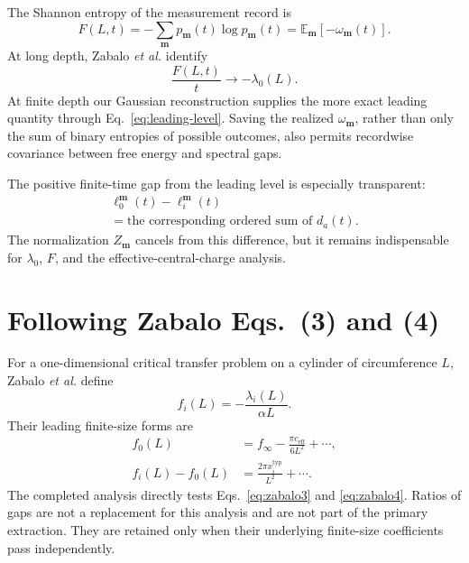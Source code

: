 \documentclass[aps,prb,twocolumn,floatfix,nofootinbib,superscriptaddress]{revtex4-2}
\newcommand{\E}{\mathbb{E}}
\begin{document}
The Shannon entropy of the measurement record is
\begin{equation}
 F(L,t)
 =-\sum_{\boldsymbol m}p_{\boldsymbol m}(t)\log p_{\boldsymbol m}(t)
 =\E_{\boldsymbol m}[-\omega_{\boldsymbol m}(t)].
 \label{eq:free-energy}
\end{equation}
At long depth, Zabalo \emph{et al.} identify
\begin{equation}
 \frac{F(L,t)}{t}\longrightarrow-\lambda_0(L).
 \label{eq:f-lambda0}
\end{equation}
At finite depth our Gaussian reconstruction supplies the more exact leading quantity through Eq.~\eqref{eq:leading-level}.  Saving the realized \(\omega_{\boldsymbol m}\), rather than only the sum of binary entropies of possible outcomes, also permits recordwise covariance between free energy and spectral gaps.

The positive finite-time gap from the leading level is especially transparent:
\begin{multline}
 \ell_0^{\boldsymbol m}(t)-\ell_i^{\boldsymbol m}(t)\\
 =\text{the corresponding ordered sum of }d_a(t).
 \label{eq:ordered-gap}
\end{multline}
The normalization \(Z_{\boldsymbol m}\) cancels from this difference, but it remains indispensable for \(\lambda_0\), \(F\), and the effective-central-charge analysis.

\section{Following Zabalo Eqs.~(3) and (4)}

For a one-dimensional critical transfer problem on a cylinder of circumference \(L\), Zabalo \emph{et al.} define
\begin{equation}
 f_i(L)=-\frac{\lambda_i(L)}{\alpha L}.
 \label{eq:fi}
\end{equation}
Their leading finite-size forms are
\begin{align}
 f_0(L)&=f_\infty-\frac{\pi c_{\mathrm{eff}}}{6L^2}+\cdots,
 \label{eq:zabalo3}\\
 f_i(L)-f_0(L)&=\frac{2\pi x_i^{\mathrm{typ}}}{L^2}+\cdots.
 \label{eq:zabalo4}
\end{align}
The completed analysis directly tests Eqs.~\eqref{eq:zabalo3} and \eqref{eq:zabalo4}.  Ratios of gaps are not a replacement for this analysis and are not part of the primary extraction.  They are retained only when their underlying finite-size coefficients pass independently.
\end{document}
